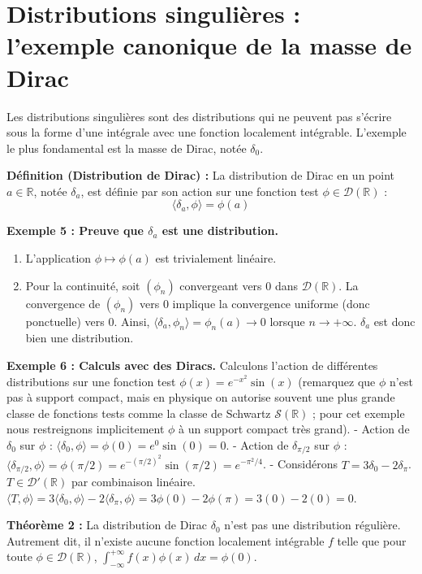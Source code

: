 \documentclass[11pt,a4paper]{article}
\begin{document}
\section{Distributions singulières : l'exemple canonique de la masse de Dirac}

Les distributions singulières sont des distributions qui ne peuvent pas s'écrire sous la forme d'une intégrale avec une fonction localement intégrable. L'exemple le plus fondamental est la masse de Dirac, notée $\delta_0$.

\textbf{Définition (Distribution de Dirac) :} La distribution de Dirac en un point $a \in \mathbb{R}$, notée $\delta_a$, est définie par son action sur une fonction test $\phi \in \mathcal{D}(\mathbb{R})$ :
$$ \langle \delta_a, \phi \rangle = \phi(a) $$

\textbf{Exemple 5 : Preuve que $\delta_a$ est une distribution.}
\begin{enumerate}
\item L'application $\phi \mapsto \phi(a)$ est trivialement linéaire.
\item Pour la continuité, soit $(\phi_n)$ convergeant vers $0$ dans $\mathcal{D}(\mathbb{R})$.
   La convergence de $(\phi_n)$ vers $0$ implique la convergence uniforme (donc ponctuelle) vers $0$.
   Ainsi, $\langle \delta_a, \phi_n \rangle = \phi_n(a) \to 0$ lorsque $n \to +\infty$.
   $\delta_a$ est donc bien une distribution.
\end{enumerate}

\textbf{Exemple 6 : Calculs avec des Diracs.}
Calculons l'action de différentes distributions sur une fonction test $\phi(x) = e^{-x^2} \sin(x)$ (remarquez que $\phi$ n'est pas à support compact, mais en physique on autorise souvent une plus grande classe de fonctions tests comme la classe de Schwartz $\mathcal{S}(\mathbb{R})$ ; pour cet exemple nous restreignons implicitement $\phi$ à un support compact très grand).
- Action de $\delta_0$ sur $\phi$ : $\langle \delta_0, \phi \rangle = \phi(0) = e^0 \sin(0) = 0$.
- Action de $\delta_{\pi/2}$ sur $\phi$ : $\langle \delta_{\pi/2}, \phi \rangle = \phi(\pi/2) = e^{-(\pi/2)^2} \sin(\pi/2) = e^{-\pi^2/4}$.
- Considérons $T = 3\delta_0 - 2\delta_\pi$. $T \in \mathcal{D}'(\mathbb{R})$ par combinaison linéaire.
  $\langle T, \phi \rangle = 3\langle \delta_0, \phi \rangle - 2\langle \delta_\pi, \phi \rangle = 3\phi(0) - 2\phi(\pi) = 3(0) - 2(0) = 0$.

\textbf{Théorème 2 :} La distribution de Dirac $\delta_0$ n'est pas une distribution régulière. Autrement dit, il n'existe aucune fonction localement intégrable $f$ telle que pour toute $\phi \in \mathcal{D}(\mathbb{R})$, $\int_{-\infty}^{+\infty} f(x)\phi(x) \, dx = \phi(0)$.
\end{document}
